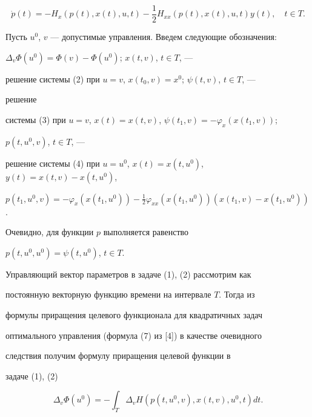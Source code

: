 \begin{equation} 


\Dot p(t)=-H_x(p(t),x(t),u,t)-\frac{1}{2} 


H_{xx}(p(t),x(t),u,t)y(t),\quad t\in T. 


\end{equation} 


 


Пусть $u^0$, $v$ --- допустимые управления. Введем следующие обозначения: 


$\Delta_v\Phi(u^0)=\Phi(v)-\Phi(u^0)$; $x(t,v)$, $t\in T$, --- 


решение системы (2) при $u=v$, $x(t_0,v)=x^0$; $\psi(t,v)$, $t\in T$, --- 


решение 


системы (3) при $u=v$, $x(t)=x(t,v)$, $\psi(t_1,v)=-\varphi_x(x(t_1,v))$; 


$p(t,u^0,v)$, $t\in T$, --- 


решение системы (4) при $u=u^0$, $x(t)=x(t,u^0)$, $y(t)=x(t,v)-x(t,u^0)$, 


$p(t_1,u^0,v)=-\varphi_x(x(t_1,u^0))-\frac{1}{2} 


\varphi_{xx}(x(t_1,u^0))(x(t_1,v)-x(t_1,u^0))$. 


Очевидно, для функции $p$ выполняется равенство 


$p(t,u^0,u^0)=\psi(t,u^0)$, $t\in T$. 


 


Управляющий вектор параметров в задаче (1), (2) рассмотрим как 


постоянную векторную функцию времени на интервале $T$. Тогда из


формулы приращения целевого функционала для квадратичных задач 


оптимального управления (формула (7) из [4]) в качестве очевидного 


следствия получим формулу приращения целевой функции в 


задаче (1), (2) 


\begin{equation} 


\Delta_v\Phi(u^0)=-\int_T \Delta_v 


H(p(t,u^0,v),x(t,v),u^0,t)d t. 


\end{equation} 


 


